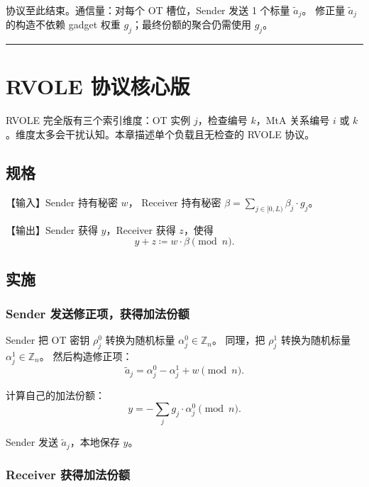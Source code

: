 协议至此结束。通信量：对每个 OT 槽位，Sender 发送 1 个标量 $\tilde a_j$。
修正量 $\tilde a_j$ 的构造不依赖 gadget 权重 $g_j$；最终份额的聚合仍需使用 $g_j$。

\begin{center}\rule{0.5\linewidth}{0.5pt}\end{center}

\section{RVOLE 协议核心版}

RVOLE 完全版有三个索引维度：OT 实例 $j$，检查编号 $k$，MtA
关系编号 $i$ 或 $k$。维度太多会干扰认知。本章描述单个负载且无检查的
RVOLE 协议。

\subsection{规格}

【输入】Sender 持有秘密 $w$，
Receiver 持有秘密 $\beta=\sum_{j\in[0,L)} \beta_j \cdot g_j$。

【输出】Sender 获得 $y$，Receiver 获得 $z$，使得
\begin{equation}\label{eq:06-rvole:4}
  y + z \coloneq w \cdot \beta \pmod{n}.
\end{equation}

\subsection{实施}
\subsubsection{Sender 发送修正项，获得加法份额}

Sender 把 OT 密钥 $\rho^0_j$ 转换为随机标量 $\alpha^0_j\in\mathbb{Z}_n$。
同理，把 $\rho^1_j$ 转换为随机标量 $\alpha^1_j\in\mathbb{Z}_n$。
然后构造修正项：
\begin{equation}\label{eq:06-rvole:5}
  \tilde{a}_{j} = \alpha^0_{j} - \alpha^1_{j} + w \pmod{n}.
\end{equation}

计算自己的加法份额：
\begin{equation}\label{eq:06-rvole:6}
  y = -\sum_j g_j \cdot \alpha^0_j \pmod n.
\end{equation}

Sender 发送 $\tilde{a}_j$，本地保存 $y$。

\subsubsection{Receiver 获得加法份额}

